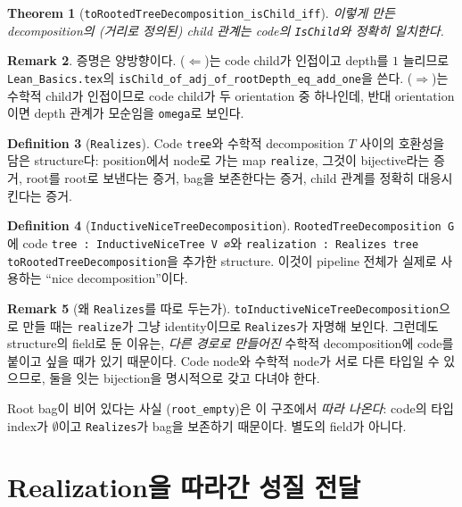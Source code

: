 \documentclass[11pt]{article}
\theoremstyle{definition}
\newtheorem{definition}{Definition}[section]
\newtheorem{remark}[definition]{Remark}
\theoremstyle{plain}
\newtheorem{theorem}[definition]{Theorem}
\newcommand{\lean}[1]{\texttt{#1}}
\newcommand{\leanfile}[1]{\texttt{#1}}
\begin{document}
\begin{theorem}[\lean{toRootedTreeDecomposition\_isChild\_iff}]
\label{nice:thm:childiff}
이렇게 만든 decomposition의 (거리로 정의된) child 관계는 code의
\lean{IsChild}와 정확히 일치한다.
\end{theorem}

\begin{remark}
증명은 양방향이다. ($\Leftarrow$)는 code child가 인접이고 depth를 $1$ 늘리므로
\leanfile{Lean\_Basics.tex}의
\lean{isChild\_of\_adj\_of\_rootDepth\_eq\_add\_one}을 쓴다. ($\Rightarrow$)는
수학적 child가 인접이므로 code child가 두 orientation 중 하나인데, 반대
orientation이면 depth 관계가 모순임을 \lean{omega}로 보인다.
\end{remark}

\begin{definition}[\lean{Realizes}]
\label{nice:def:realizes}
Code \lean{tree}와 수학적 decomposition $T$ 사이의 호환성을 담은 structure다:
position에서 node로 가는 map \lean{realize}, 그것이 bijective라는 증거,
root를 root로 보낸다는 증거, bag을 보존한다는 증거, child 관계를 정확히
대응시킨다는 증거.
\end{definition}

\begin{definition}[\lean{InductiveNiceTreeDecomposition}]
\label{nice:def:indnicedecomp}
\lean{RootedTreeDecomposition G}에 code \lean{tree : InductiveNiceTree V ∅}와
\lean{realization : Realizes tree toRootedTreeDecomposition}을 추가한
structure. 이것이 pipeline 전체가 실제로 사용하는 ``nice decomposition''이다.
\end{definition}

\begin{remark}[왜 \lean{Realizes}를 따로 두는가]
\label{nice:rem:whyrealizes}
\lean{toInductiveNiceTreeDecomposition}으로 만들 때는 \lean{realize}가 그냥
identity이므로 \lean{Realizes}가 자명해 보인다. 그런데도 structure의 field로
둔 이유는, \emph{다른 경로로 만들어진} 수학적 decomposition에 code를 붙이고
싶을 때가 있기 때문이다. Code node와 수학적 node가 서로 다른 타입일 수
있으므로, 둘을 잇는 bijection을 명시적으로 갖고 다녀야 한다.

Root bag이 비어 있다는 사실 (\lean{root\_empty})은 이 구조에서
\emph{따라 나온다}: code의 타입 index가 $\emptyset$이고 \lean{Realizes}가
bag을 보존하기 때문이다. 별도의 field가 아니다.
\end{remark}

\section{Realization을 따라간 성질 전달}
\label{nice:sec:realization}
\end{document}
